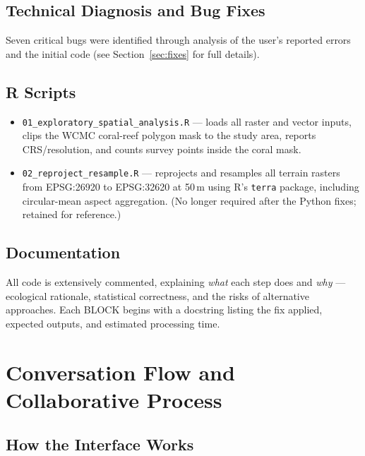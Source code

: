 \documentclass[11pt, a4paper]{article}
\begin{document}
\subsection{Technical Diagnosis and Bug Fixes}

Seven critical bugs were identified through analysis of the user's reported
errors and the initial code (see Section~\ref{sec:fixes} for full details).

\subsection{R Scripts}

\begin{itemize}[noitemsep]
  \item \texttt{01\_exploratory\_spatial\_analysis.R} — loads all raster and
        vector inputs, clips the WCMC coral-reef polygon mask to the study area,
        reports CRS/resolution, and counts survey points inside the coral mask.
  \item \texttt{02\_reproject\_resample.R} — reprojects and resamples all
        terrain rasters from EPSG:26920 to EPSG:32620 at 50\,m using R's
        \texttt{terra} package, including circular-mean aspect aggregation.
        (No longer required after the Python fixes; retained for reference.)
\end{itemize}

\subsection{Documentation}

All code is extensively commented, explaining \textit{what} each step does and
\textit{why} — ecological rationale, statistical correctness, and the risks of
alternative approaches.  Each BLOCK begins with a docstring listing the fix
applied, expected outputs, and estimated processing time.

\section{Conversation Flow and Collaborative Process}

\subsection{How the Interface Works}
\end{document}
